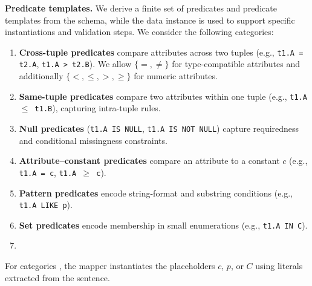 \smallskip\noindent\textbf{Predicate templates.}
We derive a finite set of predicates and predicate templates from the schema, while the data instance is used to support specific instantiations and validation steps. We consider the following categories:
\begin{enumerate}
    \item \textbf{Cross-tuple predicates} compare attributes across two tuples (e.g., \texttt{t1.A = t2.A}, \texttt{t1.A > t2.B}). We allow $\{=,\neq\}$ for type-compatible attributes and additionally $\{<,\leq,>,\geq\}$ for numeric attributes.
    \item \textbf{Same-tuple predicates} compare two attributes within one tuple (e.g., \texttt{t1.A $\leq$ t1.B}), capturing intra-tuple rules.
    \item \textbf{Null predicates} (\texttt{t1.A IS NULL}, \texttt{t1.A IS NOT NULL}) capture requiredness and conditional missingness constraints.
    \item \textbf{Attribute--constant predicates} compare an attribute to a constant $c$ (e.g., \texttt{t1.A = c}, \texttt{t1.A $\geq$ c}).
    \item \textbf{Pattern predicates} encode string-format and substring conditions (e.g., \texttt{t1.A LIKE p}).
    \item \textbf{Set predicates} encode membership in small enumerations (e.g., \texttt{t1.A IN C}).
    \DIFaddbegin \item \textbf{} \texttt{}\DIFaddend \end{enumerate}
For categories \DIFdelbegin {}\DIFdelend \DIFaddbegin {}\DIFaddend , the mapper instantiates the placeholders $c$, $p$, or $C$ using literals extracted from the sentence.

